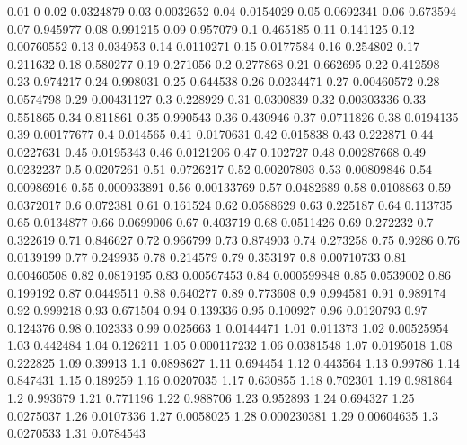 0.01 0
0.02 0.0324879
0.03 0.0032652
0.04 0.0154029
0.05 0.0692341
0.06 0.673594
0.07 0.945977
0.08 0.991215
0.09 0.957079
0.1 0.465185
0.11 0.141125
0.12 0.00760552
0.13 0.034953
0.14 0.0110271
0.15 0.0177584
0.16 0.254802
0.17 0.211632
0.18 0.580277
0.19 0.271056
0.2 0.277868
0.21 0.662695
0.22 0.412598
0.23 0.974217
0.24 0.998031
0.25 0.644538
0.26 0.0234471
0.27 0.00460572
0.28 0.0574798
0.29 0.00431127
0.3 0.228929
0.31 0.0300839
0.32 0.00303336
0.33 0.551865
0.34 0.811861
0.35 0.990543
0.36 0.430946
0.37 0.0711826
0.38 0.0194135
0.39 0.00177677
0.4 0.014565
0.41 0.0170631
0.42 0.015838
0.43 0.222871
0.44 0.0227631
0.45 0.0195343
0.46 0.0121206
0.47 0.102727
0.48 0.00287668
0.49 0.0232237
0.5 0.0207261
0.51 0.0726217
0.52 0.00207803
0.53 0.00809846
0.54 0.00986916
0.55 0.000933891
0.56 0.00133769
0.57 0.0482689
0.58 0.0108863
0.59 0.0372017
0.6 0.072381
0.61 0.161524
0.62 0.0588629
0.63 0.225187
0.64 0.113735
0.65 0.0134877
0.66 0.0699006
0.67 0.403719
0.68 0.0511426
0.69 0.272232
0.7 0.322619
0.71 0.846627
0.72 0.966799
0.73 0.874903
0.74 0.273258
0.75 0.9286
0.76 0.0139199
0.77 0.249935
0.78 0.214579
0.79 0.353197
0.8 0.00710733
0.81 0.00460508
0.82 0.0819195
0.83 0.00567453
0.84 0.000599848
0.85 0.0539002
0.86 0.199192
0.87 0.0449511
0.88 0.640277
0.89 0.773608
0.9 0.994581
0.91 0.989174
0.92 0.999218
0.93 0.671504
0.94 0.139336
0.95 0.100927
0.96 0.0120793
0.97 0.124376
0.98 0.102333
0.99 0.025663
1 0.0144471
1.01 0.011373
1.02 0.00525954
1.03 0.442484
1.04 0.126211
1.05 0.000117232
1.06 0.0381548
1.07 0.0195018
1.08 0.222825
1.09 0.39913
1.1 0.0898627
1.11 0.694454
1.12 0.443564
1.13 0.99786
1.14 0.847431
1.15 0.189259
1.16 0.0207035
1.17 0.630855
1.18 0.702301
1.19 0.981864
1.2 0.993679
1.21 0.771196
1.22 0.988706
1.23 0.952893
1.24 0.694327
1.25 0.0275037
1.26 0.0107336
1.27 0.0058025
1.28 0.000230381
1.29 0.00604635
1.3 0.0270533
1.31 0.0784543
